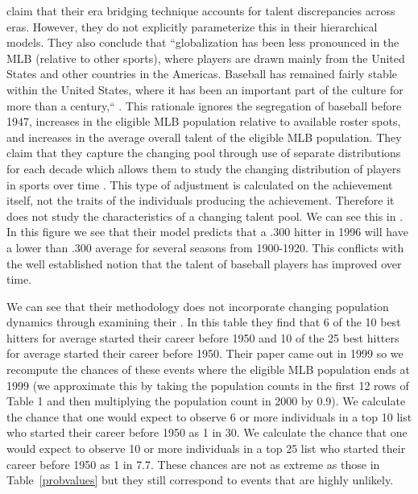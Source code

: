 \documentclass[11pt]{article}\usepackage[]{graphicx}\usepackage[]{color}
\begin{document}
\citet{berry1999eras} claim that their era bridging technique accounts for 
talent discrepancies across eras.  However, they do not explicitly 
parameterize this in their hierarchical models.  They also conclude that 
``globalization has been less pronounced in the MLB (relative to other 
sports), where players are drawn mainly from the United States and other 
countries in the Americas.  Baseball has remained fairly stable within the 
United States, where it has been an important part of the culture for more 
than a century,`` \citep{berry1999eras}.  This rationale ignores the 
segregation of baseball before 1947, increases in the eligible MLB population 
relative to available roster spots, and increases in the average overall 
talent of the eligible MLB population.  They claim that they capture the 
changing pool through use of separate distributions for each decade which 
allows them to study the changing distribution of players in sports 
over time \citep{berry1999eras}.  This type of adjustment is calculated on 
the achievement itself, not the traits of the individuals producing the 
achievement.  Therefore it does not study the characteristics of a 
changing talent pool. We can see this in 
\citet[panel (c) of Figure 7]{berry1999eras}.
In this figure we see that their model predicts that a .300 hitter in 1996 
will have a lower than .300 average for several seasons from 1900-1920. 
This conflicts with the well established notion that the talent of baseball 
players has improved over time.  

We can see that their methodology does not incorporate changing population 
dynamics through examining their \citet[Table 9]{berry1999eras}.  In this 
table they find that 6 of the 10 best hitters for average started their 
career before 1950 and 10 of the 25 best hitters for average started their 
career before 1950.  Their paper came out in 1999 so we recompute the 
chances of these events where the eligible MLB population ends at 1999 
(we approximate this by taking the population counts in the first 12 rows 
of Table 1 and then multiplying the population count in 2000 by 0.9).  
We calculate the chance that one would expect to observe 6 or more 
individuals in a top 10 list who started their career before 1950 as 
1 in 30. 
We calculate the chance that one would expect to observe 10 or more 
individuals in a top 25 list who started their career before 1950 as 
1 in 7.7.  These chances are not as extreme 
as those in Table~\ref{probvalues} but they still correspond to events that 
are highly unlikely.  
\end{document}
